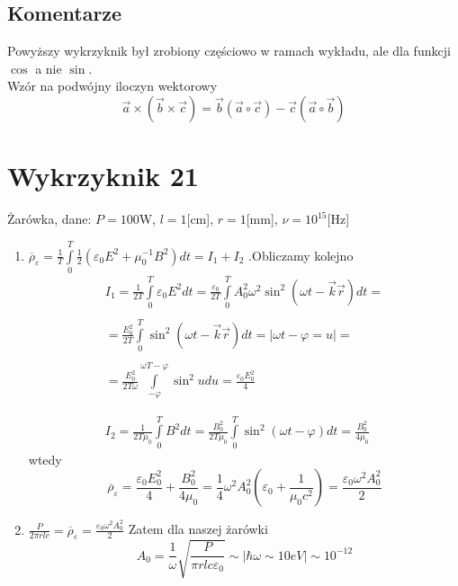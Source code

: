 \documentclass[a4paper,12pt]{article}
\begin{document}
\subsection{Komentarze}
	Powyższy wykrzyknik był zrobiony częściowo w ramach wykładu, ale dla funkcji $\cos$ a nie $\sin$.\\
	Wzór na podwójny iloczyn wektorowy
	$$
	\vec{a}\times(\vec{b}\times\vec{c}) = \vec{b}(\vec{a}\circ\vec{c}) - \vec{c}(\vec{a}\circ\vec{b})
	$$
\section{Wykrzyknik 21}
	Żarówka, dane: $P=100$W, $l = 1$[cm], $r=1$[mm], $\nu=10^{15}$[Hz]
	\begin{enumerate}
		\item $\overline{\rho}_\varepsilon  = \frac{1}{T}\int\limits_0^T\frac{1}{2}(\varepsilon_0E^2+\mu_0^{-1}B^2)dt = I_1+I_2$
		.Obliczamy kolejno
		$$
		\begin{gathered}
			I_1 = \frac{1}{2T}\int\limits_0^T\varepsilon_0E^2 dt = \frac{\varepsilon_0}{2T}\int\limits_0^TA_0^2\omega^2\sin^2(\omega t -\vec{k}\vec{r})dt = \\\\
				= \frac{E_0^2}{2T}\int\limits_0^T\sin^2(\omega t -\vec{k}\vec{r})dt = \big\vert \omega t - \varphi = u\big\vert = \\\\
				= \frac{E_0^2}{2T\omega}\int\limits_{-\varphi}^{\omega T-\varphi}\sin^2u du = \frac{\varepsilon_0 E_0^2}{4} \\\\\\
			I_2 = \frac{1}{2T\mu_0}\int\limits_0^T B^2 dt = \frac{B_0^2}{2T\mu_0}\int\limits_0^T\sin^2(\omega t -\varphi)dt = \frac{B_0^2}{4\mu_0}
		\end{gathered}
		$$
		wtedy 
		$$
			\overline{\rho}_\varepsilon = \frac{\varepsilon_0 E_0^2}{4}+ \frac{B_0^2}{4\mu_0} = \frac{1}{4}\omega^2A_0^2(\varepsilon_0+\frac{1}{\mu_0c^2})=\frac{\varepsilon_0\omega^2A_0^2}{2}
		$$
		\item $\frac{P}{2\pi r l c} = \overline{\rho}_\varepsilon = \frac{\varepsilon_0\omega^2A_0^2}{2}$
		Zatem dla naszej żarówki 
		$$
			A_0 = \frac{1}{\omega}\sqrt{\frac{P}{\pi r l c \varepsilon_0}} \sim \big\vert \hbar \omega \sim 10eV\big\vert \sim 10^{-12}
		$$
	\end{enumerate}
\end{document}
